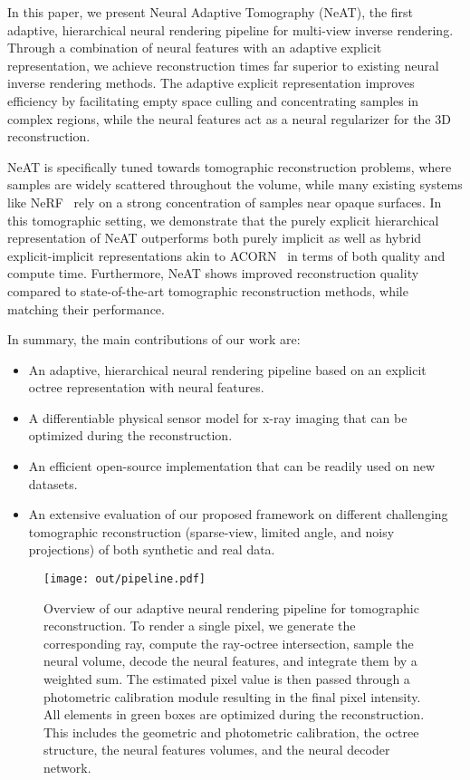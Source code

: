 \documentclass[acmtog,nonacm]{acmart} \acmSubmissionID{0438}
\newcommand{\neat}{NeAT\xspace}
\begin{document}
In this paper, we present Neural Adaptive Tomography (\neat), the
first adaptive, hierarchical neural rendering pipeline for multi-view
inverse rendering. Through a combination of neural features with an
adaptive explicit representation, we achieve reconstruction times far
superior to existing neural inverse rendering methods. The adaptive
explicit representation improves efficiency by facilitating empty
space culling and concentrating samples in complex regions, while the
neural features act as a neural regularizer for the 3D reconstruction.

\neat is specifically tuned towards tomographic reconstruction
problems, where samples are widely scattered throughout the volume,
while many existing systems like NeRF~\cite{mildenhall2020nerf} rely
on a strong concentration of samples near opaque surfaces. In this
tomographic setting, we demonstrate that the purely explicit
hierarchical representation of \neat outperforms both purely implicit
as well as hybrid explicit-implicit representations akin to
ACORN~\cite{martel2021acorn} in terms of both quality and compute
time. Furthermore, \neat shows improved reconstruction quality
compared to state-of-the-art tomographic reconstruction methods, while
matching their performance.


In summary, the main contributions of our work are:
\begin{itemize}
\item An adaptive, hierarchical neural rendering pipeline based on
  an explicit octree representation with neural features.
\item A differentiable physical sensor model for x-ray imaging that can be optimized during the reconstruction.
\item An efficient open-source implementation that can be readily used on new datasets.
\item An extensive evaluation of our proposed framework on different challenging tomographic reconstruction 
(sparse-view, limited angle, and noisy projections) of both synthetic and real data.
\end{itemize} 
 
\begin{figure*}
	\texttt{[image: out/pipeline.pdf]}
	\caption{
		Overview of our adaptive neural rendering pipeline for tomographic reconstruction.
		To render a single pixel, we generate the corresponding ray, compute the ray-octree intersection, sample the neural volume, decode the neural features, and integrate them by a weighted sum.
		The estimated pixel value is then passed through a photometric calibration module resulting in the final pixel intensity.
		All elements in green boxes are optimized during the reconstruction.
		This includes the geometric and photometric calibration, the octree structure, the neural features volumes, and the neural decoder network.
	}
	\label{fig:pipeline_overview}
\end{figure*}
\end{document}
